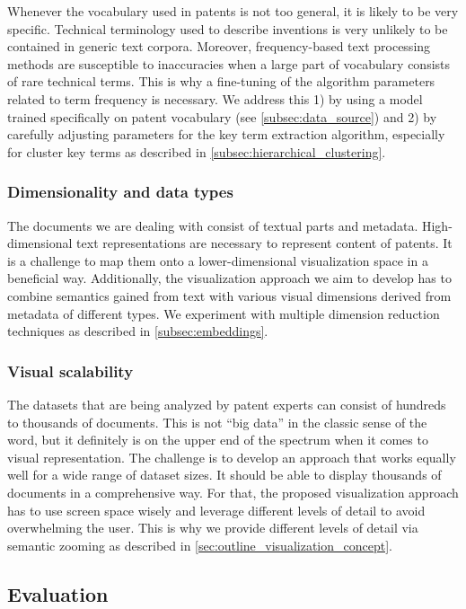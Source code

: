 Whenever the vocabulary used in patents is not too general, it is likely to be very specific.
Technical terminology used to describe inventions is very unlikely to be contained in generic text corpora.
Moreover, frequency-based text processing methods are susceptible to inaccuracies when a large part of vocabulary consists of rare technical terms.
This is why a fine-tuning of the algorithm parameters related to term frequency is necessary.
We address this 1) by using a model trained specifically on patent vocabulary (see \autoref{subsec:data_source})  and 2) by carefully adjusting parameters for the key term extraction algorithm, especially for cluster key terms as described in \autoref{subsec:hierarchical_clustering}.

\subsubsection{Dimensionality and data types}

The documents we are dealing with consist of textual parts and metadata. 
High-dimensional text representations are necessary to represent content of patents.
It is a challenge to map them onto a lower-dimensional visualization space in a beneficial way.
Additionally, the visualization approach we aim to develop has to combine semantics gained from text with various visual dimensions derived from metadata of different types.
We experiment with multiple dimension reduction techniques as described in \autoref{subsec:embeddings}.

\subsubsection{Visual scalability}

The datasets that are being analyzed by patent experts can consist of hundreds to thousands of documents.
This is not ``big data'' in the classic sense of the word, but it definitely is on the upper end of the spectrum when it comes to visual representation.
The challenge is to develop an approach that works equally well for a wide range of dataset sizes.
It should be able to display thousands of documents in a comprehensive way.
For that, the proposed visualization approach has to use screen space wisely and leverage different levels of detail to avoid overwhelming the user.
This is why we provide different levels of detail via semantic zooming as described in \autoref{sec:outline_visualization_concept}.

\subsection{Evaluation}

